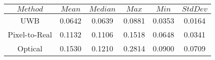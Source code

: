 \begin{table}[h]
\centering
\begin{tabular}{|c|c|c|c|c|c|}
\hline
$Method$ & $Mean$ & $Median$ & $Max$ & $Min$ & $StdDev$ \\
\hline
UWB & 0.0642 & 0.0639 & 0.0881 & 0.0353 & 0.0164 \\
\hline
Pixel-to-Real & 0.1132 & 0.1106 & 0.1518 & 0.0648 & 0.0341 \\
\hline
Optical & 0.1530 & 0.1210 & 0.2814 & 0.0900 & 0.0709 \\
\hline
\end{tabular}
\end{table}
